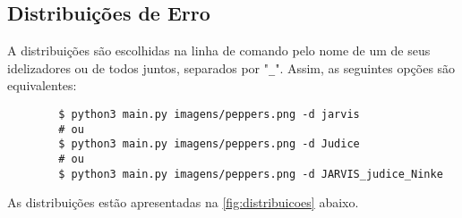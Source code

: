 \subsection{Distribuições de Erro} \label{sec:distribuicoes}

    A distribuições são escolhidas na linha de comando pelo nome de um de seus idelizadores ou de todos juntos, separados por "\texttt{\_}". Assim, as seguintes opções são equivalentes:

    \begin{verbatim}
        $ python3 main.py imagens/peppers.png -d jarvis
        # ou
        $ python3 main.py imagens/peppers.png -d Judice
        # ou
        $ python3 main.py imagens/peppers.png -d JARVIS_judice_Ninke
    \end{verbatim}

    As distribuições estão apresentadas na \cref{fig:distribuicoes} abaixo.

